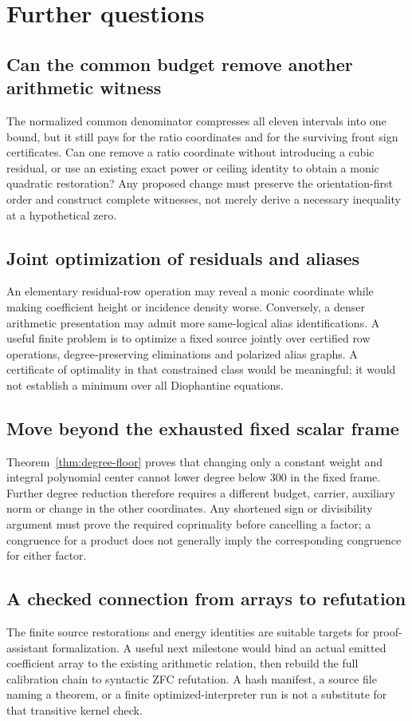\section{Further questions}
\subsection{Can the common budget remove another arithmetic witness}
The normalized common denominator compresses all eleven intervals into one
bound, but it still pays for the ratio coordinates and for the surviving
front sign certificates. Can one remove a ratio coordinate without introducing a cubic residual,
or use an existing exact power or ceiling identity to obtain a monic
quadratic restoration? Any proposed
change must preserve the orientation-first order and construct complete
witnesses, not merely derive a necessary inequality at a hypothetical zero.

\subsection{Joint optimization of residuals and aliases}
An elementary residual-row operation may reveal a monic coordinate while
making coefficient height or incidence density worse. Conversely, a denser
arithmetic presentation may admit more same-logical alias identifications.
A useful finite problem is to optimize a fixed source jointly over certified
row operations, degree-preserving eliminations and polarized alias graphs.
A certificate of optimality in that constrained class would be meaningful;
it would not establish a minimum over all Diophantine equations.

\subsection{Move beyond the exhausted fixed scalar frame}
Theorem~\ref{thm:degree-floor} proves that changing only a constant weight
and integral polynomial center cannot lower degree below 300 in the fixed
frame. Further degree reduction therefore requires a different budget,
carrier, auxiliary norm or change in the other coordinates. Any shortened
sign or divisibility argument must prove the required coprimality before
cancelling a factor; a congruence for a product does not generally imply
the corresponding congruence for either factor.

\subsection{A checked connection from arrays to refutation}
The finite source restorations and energy identities are suitable targets
for proof-assistant formalization. A useful next milestone would bind an
actual emitted coefficient array to the existing arithmetic relation, then
rebuild the full calibration chain to syntactic ZFC refutation. A hash
manifest, a source file naming a theorem, or a finite optimized-interpreter
run is not a substitute for that transitive kernel check.
